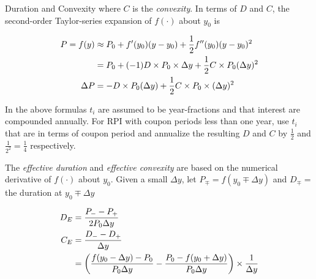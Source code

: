 \documentclass{article}
\begin{document}
\begin{section}{Duration and Convexity}
\noindent where $C$ is the \emph{convexity}. In terms of $D$ and $C$, the
second-order Taylor-series expansion of $f(\cdot)$ about $y_0$ is

\begin{align}
P = f(y) &\approx P_0 + f'(y_0) (y - y_0) + \frac{1}{2} f''(y_0) (y - y_0)^2
  \notag\\
     &= P_0 + (-1) D \times P_0 \times \Delta y + 
        \frac{1}{2} C \times P_0 (\Delta y)^2 \notag\\
\Delta P &= - D \times P_0 (\Delta y) + \frac{1}{2} C \times P_0 \times (\Delta y)^2
  \notag
\end{align}

In the above formulas $t_i$ are assumed to be year-fractions and that
interest are compounded annually. For RPI with coupon periods less than
one year, use $t_i$ that are in terms of coupon period and annualize
the resulting $D$ and $C$ by $\frac{1}{2}$ and $\frac{1}{2^2} = \frac{1}{4}$
respectively.

The \emph{effective duration} and \emph{effective convexity} are based on
the numerical derivative of $f(\cdot)$ about $y_0$. Given a small $\Delta y$,
let $P_{\mp} = f(y_0 \mp \Delta y)$ and $D_{\mp} = $ the duration at 
$y_0 \mp \Delta y$

\begin{align}
D_E &= \frac{P_{-} - P_{+}}{2 P_0 \Delta y} \notag\\
C_E &= \frac{D_{-} - D_{+}}{\Delta y} \notag\\
    &= \left(\frac{f(y_0 - \Delta y) - P_0}{P_0 \Delta y} - 
              \frac{P_0 - f(y_0 + \Delta y)}{P_0 \Delta y}\right)
       \times \frac{1}{\Delta y}\notag
\end{align}
\end{section}
\end{document}
